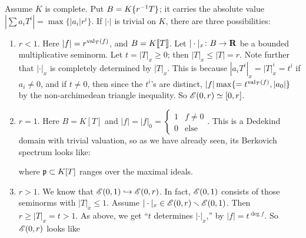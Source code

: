 Assume $K$ is complete. Put $B=K\{ r^{-1} T \}$; it carries the absolute 
value $|\sum a_i T^i| = \max \{|a_i| r^i\}$. If $|\cdot|$ is trivial on $K$, 
there are three possibilities: 
\begin{enumerate}
\item
$r<1$. Here $|f|=r^{\operatorname{val}_T(f)}$, and $B=K\llbracket T\rrbracket$. Let 
$|\cdot|_x\colon B\to \mathbf{R}$ be a bounded multiplicative seminorm. Let 
$t=|T|_x\geqslant 0$; then $|T|_x \leqslant |T|=r$. Note further that 
$|\cdot|_x$ is completely determined by $|T|_x$. This is because 
$|a_i T^i|_x = |T|_x^i=t^i$ if $a_i\ne 0$, and if $t\ne 0$, then since the 
$t^i$'s are distinct, $|f|\max\{=t^{\operatorname{val}_T(f)},|a_0|\}$ by the 
non-archimedean triangle inequality. So $\mathscr{E}(0,r) \simeq [0,r]$. 

\item
$r=1$. Here $B=K[T]$ and 
$|f|=|f|_0=\begin{cases} 1 & f\ne 0 \\ 0 & \text{else}\end{cases}$. This is a 
Dedekind domain with trivial valuation, so as we have already seen, its 
Berkovich spectrum looks like: 
\begin{center}
\end{center}
where $\mathfrak{p}\subset K[T]$ ranges over the maximal ideals. 

\item
$r>1$. We know that $\mathscr{E}(0,1)\hookrightarrow \mathscr{E}(0,r)$. In fact, $\mathscr{E}(0,1)$ 
consists of those seminorms with $|T|_x\leqslant 1$. Assume 
$|\cdot|_x\in \mathscr{E}(0,r)\smallsetminus \mathscr{E}(0,1)$. Then $r\geqslant |T|_x=t>1$. As 
above, we get ``$t$ determines $|\cdot|_x$,'' by 
$|f|=t^{\deg f}$. So $\mathscr{E}(0,r)$ looks like 
\begin{center}
\end{center}
\end{enumerate}


